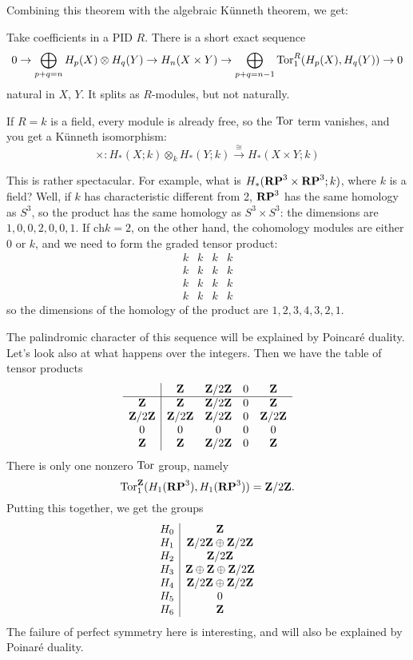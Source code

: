 Combining this theorem with the algebraic K\"unneth theorem, we get:
\begin{theorem}
Take coefficients in a PID $R$. There is a short exact sequence 
\begin{equation*}
0\to\bigoplus_{p+q=n} H_p(X)\otimes H_q(Y)\to
 H_n(X\times Y)\to\bigoplus_{p+q=n-1}\operatorname{Tor}^R_1( H_p(X), H_q(Y))\to 0
\end{equation*}
natural in $X$, $Y$. It splits as $R$-modules, but not naturally.
\end{theorem}
\begin{example}
If $R=k$ is a field, every module is already free, so the $\operatorname{Tor}$ term vanishes, and you get a K\"{u}nneth isomorphism:
\begin{equation*}
\times: H_\ast(X;k)\otimes_k H_\ast(Y;k)\xrightarrow{\cong}H_\ast(X\times Y;k)
\end{equation*}
\end{example}
This is rather spectacular. For example, what is $ H_\ast(\mathbf{RP}^3\times\mathbf{RP}^3;k)$,
where $k$ is a field? Well, if $k$ has characteristic different from 2, 
$\mathbf{RP}^3$ has the same homology as $S^3$, so the product has the same 
homology as $S^3\times S^3$: the dimensions are $1,0,0,2,0,0,1$. 
If $\mathrm{ch}k=2$, on the other hand, the cohomology modules are either
0 or $k$, and we need to form the graded tensor product:
\[
\begin{array}{cccc} k & k & k & k \\ k & k & k & k \\ 
k & k & k & k \\ k & k & k & k 
\end{array}
\]
so the dimensions of the homology of the product are 
$1,2,3,4,3,2,1$. 

The palindromic character of this sequence will be explained by Poincar\'e 
duality. Let's look also at what happens over the integers. Then we have 
the table of tensor products
\[
\begin{array}{c|cccc}
& \mathbf Z & \mathbf Z/2\mathbf Z & 0 & \mathbf Z \\
\hline
\mathbf Z & \mathbf Z & \mathbf Z/2\mathbf Z & 0 & \mathbf Z \\
\mathbf Z/2\mathbf Z & \mathbf Z/2\mathbf Z & \mathbf Z/2\mathbf Z & 0 & \mathbf Z/2\mathbf Z \\
0 & 0 & 0 & 0 & 0 \\
\mathbf Z & \mathbf Z & \mathbf Z/2\mathbf Z & 0 & \mathbf Z 
\end{array}
\]
There is only one nonzero $\operatorname{Tor}$ group, namely 
\[
\operatorname{Tor}_1^\mathbf Z(H_1(\mathbf{RP}^3),H_1(\mathbf{RP}^3))=\mathbf Z/2\mathbf Z.
\]
Putting this together, we get the groups
\[
\begin{array}{c|c}
H_0 & \mathbf Z \\
H_1 & \mathbf Z/2\mathbf Z\oplus\mathbf Z/2\mathbf Z\\
H_2 & \mathbf Z/2\mathbf Z \\
H_3 & \mathbf Z \oplus \mathbf Z \oplus\mathbf Z/2\mathbf Z \\
H_4 & \mathbf Z/2\mathbf Z\oplus\mathbf Z/2\mathbf Z\\
H_5 & 0 \\
H_6 & \mathbf Z
\end{array}
\]
The failure of perfect symmetry here is interesting, and will also be explained
by Poinar\'e duality. 






